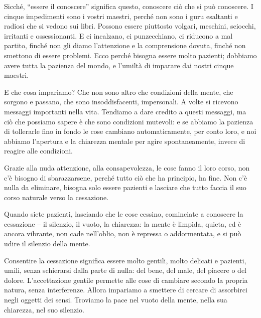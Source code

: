 Sicché, ``essere il conoscere'' significa questo, conoscere ciò che si può
conoscere. I cinque impedimenti sono i vostri maestri, perché non sono i
guru esaltanti e radiosi che si vedono sui libri. Possono essere
piuttosto volgari, meschini, sciocchi, irritanti e ossessionanti. E ci
incalzano, ci punzecchiano, ci riducono a mal partito, finché non gli
diamo l'attenzione e la comprensione dovuta, finché non smettono di
essere problemi. Ecco perché bisogna essere molto pazienti; dobbiamo
avere tutta la pazienza del mondo, e l'umiltà di imparare dai nostri
cinque maestri.

E che cosa impariamo? Che non sono altro che condizioni della mente, che
sorgono e passano, che sono insoddisfacenti, impersonali. A volte si
ricevono messaggi importanti nella vita. Tendiamo a dare credito a
questi messaggi, ma ciò che possiamo sapere è che sono condizioni
mutevoli: e se abbiamo la pazienza di tollerarle fino in fondo le cose
cambiano automaticamente, per conto loro, e noi abbiamo l'apertura e la
chiarezza mentale per agire spontaneamente, invece di reagire alle
condizioni.

Grazie alla nuda attenzione, alla consapevolezza, le cose fanno il loro
corso, non c'è bisogno di sbarazzarsene, perché tutto ciò che ha
principio, ha fine. Non c'è nulla da eliminare, bisogna solo essere
pazienti e lasciare che tutto faccia il suo corso naturale verso la
cessazione.

Quando siete pazienti, lasciando che le cose cessino, cominciate a
conoscere la cessazione – il silenzio, il vuoto, la chiarezza: la mente
è limpida, quieta, ed è ancora vibrante, non cade nell'oblio, non è
repressa o addormentata, e si può udire il silenzio della mente.

Consentire la cessazione significa essere molto gentili, molto delicati
e pazienti, umili, senza schierarsi dalla parte di nulla: del bene, del
male, del piacere o del dolore. L'accettazione gentile permette alle
cose di cambiare secondo la propria natura, senza interferenze. Allora
impariamo a smettere di cercare di assorbirci negli oggetti dei sensi.
Troviamo la pace nel vuoto della mente, nella sua chiarezza, nel suo
silenzio.

